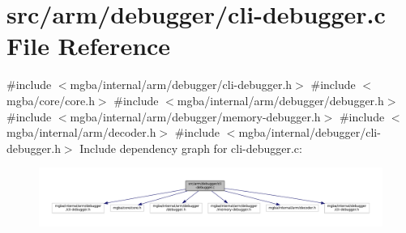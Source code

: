 \hypertarget{arm_2debugger_2cli-debugger_8c}{}\section{src/arm/debugger/cli-\/debugger.c File Reference}
\label{arm_2debugger_2cli-debugger_8c}
{\ttfamily \#include $<$mgba/internal/arm/debugger/cli-\/debugger.\+h$>$}\newline
{\ttfamily \#include $<$mgba/core/core.\+h$>$}\newline
{\ttfamily \#include $<$mgba/internal/arm/debugger/debugger.\+h$>$}\newline
{\ttfamily \#include $<$mgba/internal/arm/debugger/memory-\/debugger.\+h$>$}\newline
{\ttfamily \#include $<$mgba/internal/arm/decoder.\+h$>$}\newline
{\ttfamily \#include $<$mgba/internal/debugger/cli-\/debugger.\+h$>$}\newline
Include dependency graph for cli-\/debugger.c\+:
\nopagebreak
\begin{figure}[H]
\begin{center}
\leavevmode
\includegraphics[width=350pt]{arm_2debugger_2cli-debugger_8c__incl}
\end{center}
\end{figure}
